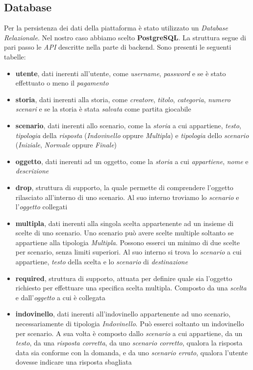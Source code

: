 \documentclass{article}
\begin{document}
\subsection*{Database}
Per la persistenza dei dati della piattaforma è stato utilizzato un \textit{Database Relazionale}. Nel nostro caso abbiamo scelto \textbf{PostgreSQL}. La struttura segue di pari passo le \textit{API} descritte nella parte di backend.  Sono presenti le seguenti tabelle:
\begin{itemize}[label = {-}]
    \itemsep0em
    \item \textbf{utente}, dati inerenti all'utente, come \textit{username}, \textit{password} e se è stato effettuato o meno il \textit{pagamento}
    \item \textbf{storia}, dati inerenti alla storia, come \textit{creatore}, \textit{titolo}, \textit{categoria}, \textit{numero scenari} e se la storia è stata \textit{salvata} come partita giocabile
    \item \textbf{scenario}, dati inerenti allo scenario, come la \textit{storia} a cui appartiene, \textit{testo}, \textit{tipologia} della \textit{risposta} (\textit{Indovinello} oppure \textit{Multipla}) e \textit{tipologia} dello \textit{scenario} (\textit{Iniziale}, \textit{Normale} oppure \textit{Finale})
    \item \textbf{oggetto}, dati inerenti ad un oggetto, come la \textit{storia} a cui \textit{appartiene}, \textit{nome} e \textit{descrizione}
    \item \textbf{drop}, struttura di supporto, la quale permette di comprendere l’oggetto rilasciato all’interno di uno scenario. Al suo interno troviamo lo \textit{scenario} e l'\textit{oggetto} collegati
    \item \textbf{multipla}, dati inerenti alla singola scelta appartenente ad un insieme di scelte di uno scenario. Uno scenario può avere scelte multiple soltanto se appartiene alla tipologia \textit{Multipla}. Possono esserci un minimo di due scelte per scenario, senza limiti superiori. Al suo interno si trova lo \textit{scenario} a cui appartiene, \textit{testo} della scelta e lo \textit{scenario} di \textit{destinazione}
    \item \textbf{required}, struttura di supporto, attuata per definire quale sia l'oggetto richiesto per effettuare una specifica scelta multipla. Composto da una \textit{scelta} e dall'\textit{oggetto} a cui è collegata
    \item \textbf{indovinello}, dati inerenti all'indovinello appartenente ad uno scenario, necessariamente di tipologia \textit{Indovinello}. Può esserci soltanto un indovinello per scenario. A sua volta è composto dallo \textit{scenario} a cui appartiene, da un \textit{testo}, da una \textit{risposta corretta}, da uno \textit{scenario corretto}, qualora la risposta data sia conforme con la domanda, e da uno \textit{scenario errato}, qualora l'utente dovesse indicare una risposta sbagliata

\end{itemize}
\end{document}
